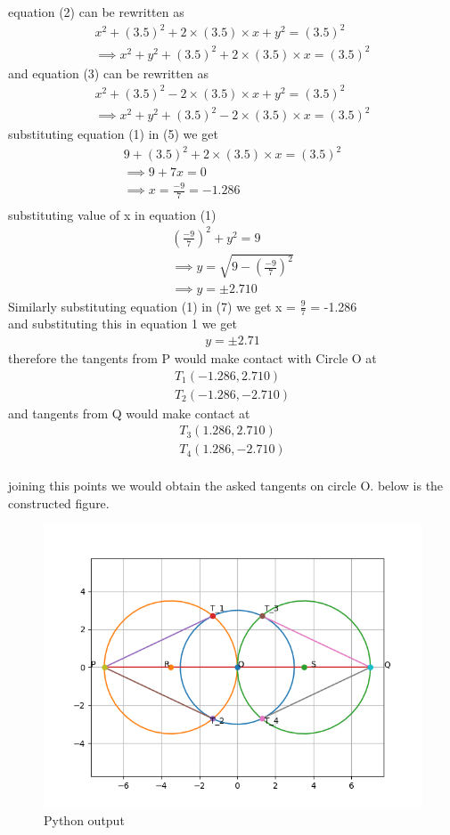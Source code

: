 \documentclass{article}
\begin{document}
equation (2) can be rewritten as 
\begin{gather}
   x^{2} + (3.5)^{2} + 2\times(3.5)\times x + y^{2} = (3.5)^2\\
   \implies  x^{2} + y^{2} + (3.5)^{2} + 2\times(3.5)\times x = (3.5)^2
\end{gather}
and equation (3) can be rewritten as 
\begin{gather}
    x^{2} + (3.5)^{2} - 2\times(3.5)\times x + y^{2} = (3.5)^2\\
    \implies  x^{2} + y^{2} + (3.5)^{2} - 2\times(3.5)\times x = (3.5)^2
\end{gather}
substituting equation (1) in (5) we get
\begin{gather*}
    9 +  (3.5)^{2} + 2\times(3.5)\times x = (3.5)^2\\
    \implies 9 + 7x = 0\\
    \implies x = \frac{-9}{7} = -1.286\\
\end{gather*}
substituting value of x in equation (1)
\begin{gather*}
    (\frac{-9}{7})^{2}+y^{2} = 9\\
    \implies y = \sqrt{9-(\frac{-9}{7})^{2}}\\
    \implies y = \pm 2.710
\end{gather*}
Similarly substituting equation (1) in (7) we get x = $\frac{9}{7}$ = -1.286
\\and substituting this in equation 1 we get
\begin{gather*}
     y = \pm 2.71 
\end{gather*}
therefore the tangents from P would make contact with Circle O at
\begin{gather*}
    T_1(-1.286,2.710)\\
    T_2(-1.286,-2.710)
\end{gather*}
and tangents from Q would make contact at 
\begin{gather*}
    T_3(1.286,2.710)\\
    T_4(1.286,-2.710)
\end{gather*}
\\ joining this points we would obtain the asked tangents on circle O.
\newpage
below is the constructed figure.
\begin{figure}[h!]
    \centering
    \includegraphics{Figure_1.png}
    \caption{Python output}
    \label{fig:my_label}
\end{figure}
\end{document}
